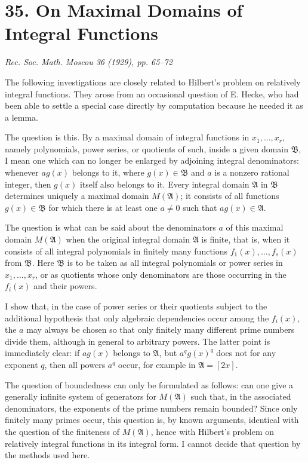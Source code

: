 \documentclass[11pt]{article}
\providecommand{\frakA}{\mathfrak A}
\providecommand{\frakB}{\mathfrak B}
\begin{document}
\clearpage

\section*{35. On Maximal Domains of Integral Functions}

\begin{center}
\emph{Rec. Soc. Math. Moscou 36 (1929), pp. 65--72}
\end{center}

The following investigations are closely related to Hilbert's problem on relatively integral functions. They arose from an occasional question of E. Hecke, who had been able to settle a special case directly by computation because he needed it as a lemma.

The question is this. By a maximal domain of integral functions in \(x_1,\ldots,x_r\), namely polynomials, power series, or quotients of such, inside a given domain \(\frakB\), I mean one which can no longer be enlarged by adjoining integral denominators: whenever \(a g(x)\) belongs to it, where \(g(x)\in\frakB\) and \(a\) is a nonzero rational integer, then \(g(x)\) itself also belongs to it. Every integral domain \(\frakA\) in \(\frakB\) determines uniquely a maximal domain \(M(\frakA)\); it consists of all functions \(g(x)\in\frakB\) for which there is at least one \(a\ne0\) such that \(a g(x)\in\frakA\).

The question is what can be said about the denominators \(a\) of this maximal domain \(M(\frakA)\) when the original integral domain \(\frakA\) is finite, that is, when it consists of all integral polynomials in finitely many functions \(f_1(x),\ldots,f_s(x)\) from \(\frakB\). Here \(\frakB\) is to be taken as all integral polynomials or power series in \(x_1,\ldots,x_r\), or as quotients whose only denominators are those occurring in the \(f_i(x)\) and their powers.

I show that, in the case of power series or their quotients subject to the additional hypothesis that only algebraic dependencies occur among the \(f_i(x)\), the \(a\) may always be chosen so that only finitely many different prime numbers divide them, although in general to arbitrary powers. The latter point is immediately clear: if \(a g(x)\) belongs to \(\frakA\), but \(a^q g(x)^q\) does not for any exponent \(q\), then all powers \(a^q\) occur, for example in \(\frakA=[2x]\).

The question of boundedness can only be formulated as follows: can one give a generally infinite system of generators for \(M(\frakA)\) such that, in the associated denominators, the exponents of the prime numbers remain bounded? Since only finitely many primes occur, this question is, by known arguments, identical with the question of the finiteness of \(M(\frakA)\), hence with Hilbert's problem on relatively integral functions in its integral form. I cannot decide that question by the methods used here.
\end{document}
